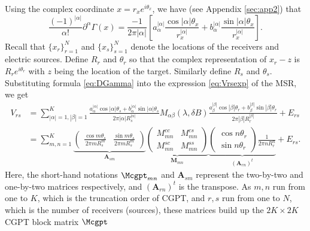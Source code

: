 Using the complex coordinate $x = r_x e^{i\theta_x}$, we have (see
Appendix \ref{sec:app2}) that
\begin{equation}
\frac{(-1)^{|\alpha|}}{\alpha!} \partial^{\alpha} \Gamma(x) =
\frac{-1}{2\pi |\alpha|} \left[ a^{|\alpha|}_\alpha \frac{\cos
|\alpha| \theta_x}{r^{|\alpha|}_x}  + b^{|\alpha|}_\alpha
\frac{\sin |\alpha| \theta_x}{r^{|\alpha|}_x} \right].
\label{eq:DGamma}
\end{equation}
Recall that $\{x_r\}_{r=1}^N$ and $\{x_s\}_{s=1}^N$ denote the
locations of the receivers and electric sources. Define $R_r$ and
$\theta_r$ so that the complex representation of $x_r - z$ is $R_r
e^{i\theta_r}$ with $z$ being the location of the target.
Similarly define $R_s$ and $\theta_s$. Substituting formula
\eqref{eq:DGamma} into the expression \eqref{eq:Vrsexp} of the
MSR, we get
\begin{equation}
\begin{aligned}
V_{rs} &= \sum_{|\alpha|= 1, |\beta|=1}^{K}
\frac{a^{|\alpha|}_\alpha \cos |\alpha| \theta_s +
b^{|\alpha|}_\alpha \sin |\alpha| \theta_s}{2\pi |\alpha|
R_s^{|\alpha|}}
 M_{\alpha \beta} (\lambda, \delta B) \frac{a^{|\beta|}_\beta \cos |\beta| \theta_r + b^{|\beta|}_\beta \sin |\beta| \theta_r}{2\pi |\beta| R_r^{|\beta|}} + E_{rs}\\
&= \sum_{m,n=1}^K \underbrace{
\begin{pmatrix} \displaystyle
\frac{\cos m\theta_s}{2\pi m R_s^m} & \displaystyle \frac{\sin
m\theta_s}{2\pi m R_s^m} \end{pmatrix}}_{\mathbf{A}_{sm}}
\underbrace{\begin{pmatrix}
M^{cc}_{mn} & M^{cs}_{mn} \\
M^{sc}_{mn} & M^{ss}_{mn}
\end{pmatrix}}_{\mathbf{M}_{mn}}
\underbrace{\begin{pmatrix}
\cos n\theta_r \\
\sin n\theta_r
\end{pmatrix}
\frac{1}{2\pi n R_r^n}}_{(\mathbf{A}_{rn})^t} + E_{rs}.
\end{aligned}
\label{eq:Vrsform}
\end{equation}
Here, the short-hand notations $\Mcgpt_{mn}$ and $\mathbf{A}_{sm}$
represent the two-by-two and one-by-two  matrices respectively,
and $(\mathbf{A}_{rn})^t$ is the transpose. As $m,n$ run from one
to $K$, which is the truncation order of CGPT, and $r,s$ run from
one to $N$, which is the number of receivers (sources), these
matrices build up the $2K \times 2K$ CGPT block matrix $\Mcgpt$
